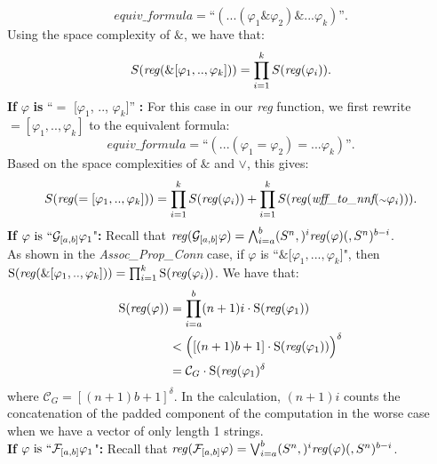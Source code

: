 \documentclass[runningheads]{llncs}
\renewcommand{\phi}{\varphi}
\begin{document}
    \[ 
    \textit{equiv\_formula} = \text{``}( ... (\phi_{1} \& \phi_{2}) \& ... \phi_{k})\text{''}.
    \]
Using the space complexity of $\&$, we have that:
    \[
    S(\text{\emph{reg}}(\& [\phi_{1}, .., \phi_{k}])) = 
    \prod_{i=1}^{k} S(\text{\emph{reg}}(\phi_{i})).
    \]
\textbf{If} $\phi$ \textbf{is} ``$=$ [$\phi_{1}$, .., $\phi_{k}$]'' \textbf{:}
For this case in our \emph{reg} function, we first rewrite $= [\phi_{1}, .., \phi_{k}]$ to the equivalent formula:
    \[ 
    \textit{equiv\_formula} = \text{``}( ... (\phi_{1} = \phi_{2}) = ... \phi_{k})\text{''}.
    \]
Based on the space complexities of $\&$ and $\lor$, this gives:
    \[
    S(\text{\emph{reg}}(= [\phi_{1}, .., \phi_{k}])) = 
    \prod_{i=1}^{k} S(\text{\emph{reg}}(\phi_{i}))
    + \prod_{i=1}^{k} S(\text{\emph{reg}}(\textit{wff\_to\_nnf}(\scriptstyle{\sim}\textstyle \phi_{i}))).
    \]
 \textbf{If} $\phi \text{ is } ``\mathcal{G}_{[a,b]} \phi_{1}$"\textbf{:}
 Recall that $\text{\emph{reg}}(\mathcal{G}_{[a,b]} \phi) = \bigwedge_{i=a}^{b} (S^n,)^i \text{\emph{reg}}(\phi) (,S^n)^{b-i}$.\\
 As shown in the \textit{Assoc\_Prop\_Conn} case, if $\phi$ is ``$\&[\phi_1, ... ,\phi_k$]", then \\
 $\text{S(\emph{reg}}(\& [\phi_{1}, .., \phi_{k}])) = 
    \prod_{i=1}^{k} \text{S(\emph{reg}}(\phi_{i}))$. We have that:
 \begin{align*}
     \text{S(\emph{reg}}(\phi)) &= \prod_{i=a}^{b} (n+1)i \cdot \text{S(\emph{reg}}(\phi_{1}))\\
     &< \Bigl([(n+1)b+1] \cdot \text{S(\emph{reg}}(\phi_1))\Bigl)^\delta \\
     &= \mathcal{C}_{G} \cdot \text{S(\emph{reg}}(\phi_1)^\delta 
 \end{align*}
 where $\mathcal{C}_{G} = [(n+1)b+1]^{\delta}$.
 In the calculation, $(n+1)i$ counts the concatenation of the padded component of the computation in the worse case when we have a vector of only length 1 strings. \\
 \textbf{If} $\phi \text{ is } ``\mathcal{F}_{[a,b]} \phi_{1}$"\textbf{:}
 Recall that $\text{\emph{reg}}(\mathcal{F}_{[a,b]} \phi) = \bigvee_{i=a}^{b} (S^n,)^i \text{\emph{reg}}(\phi)(,S^n)^{b-i}$. \\
\end{document}
